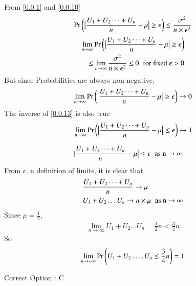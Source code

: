 \documentclass[journal,12pt,twocolumn]{IEEEtran}
\begin{document}
From \eqref{0.0.1} and \eqref{0.0.10}
\begin{align}
    \Pr\left(\big|\frac{U_1+U_2\dots+U_n}{n} - \mu\big| \geq \epsilon\right) \leq \frac{\sigma^2}{n\times\epsilon^2}\notag
\end{align}
\begin{align}
    \begin{split}
    \lim_{n \to \infty} \Pr\left(\big|\frac{U_1+U_2\dots+U_n}{n} - \mu\big| \geq \epsilon\right)\\
    \leq \lim_{n \to \infty} \frac{\sigma^2}{n\times\epsilon^2} \leq 0 \hspace{0.2cm} \text{for fixed $\epsilon > 0$}
    \end{split}
\end{align}
But since Probabilities are always non-negative,
\begin{align}
    \lim_{n \to \infty} \Pr\left(\big|\frac{U_1+U_2\dots+U_n}{n} - \mu\big| \geq \epsilon\right) \to 0 \label{0.0.13}
\end{align}
The inverse of \eqref{0.0.13} is also true
\begin{align}
    &\lim_{n \to \infty} \Pr\left(\big|\frac{U_1+U_2\dots+U_n}{n} - \mu\big| \leq \epsilon\right) \to 1 \\[0.3cm]
    &|\frac{U_1+U_2\dots+U_n}{n} - \mu\big| \leq \epsilon \hspace{0.2cm}\text{as  n $\to$ $\infty$} 
\end{align}
From $\epsilon$, n definition of limits, it is clear that 
\begin{align}
    &\frac{U_1+U_2\dots+U_n}{n} \to \mu\\
    &U_1+U_2\dots U_n \to n\times\mu \hspace{0.2cm}\text{as  n $\to$ $\infty$}
\end{align}
Since $\mu = \frac{1}{2}$,
\begin{align}
    \lim_{n \to \infty} U_1+U_2\dots U_n = \frac{1}{2}n < \frac{3}{4}n
\end{align}
So 
\begin{align}
    \lim_{n \to +\infty} \Pr\left(U_1+U_2\dots,U_n\leq \frac{3}{4}n\right) = 1
\end{align}
\begin{center}
    Correct Option : C
\end{center}
\end{document}
